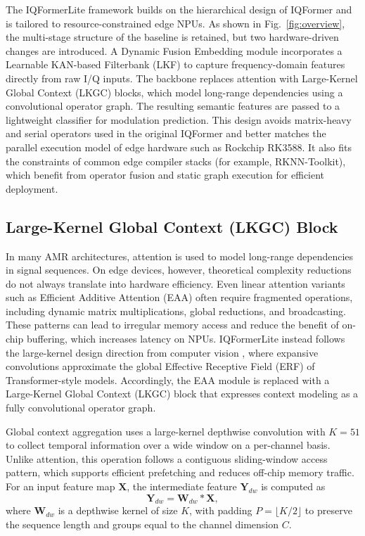 \documentclass{article}
\begin{document}
	The IQFormerLite framework builds on the hierarchical design of IQFormer \cite{shao2025IQFormernovel} and is tailored to resource-constrained edge NPUs.
	As shown in Fig.~\ref{fig:overview}, the multi-stage structure of the baseline is retained, but two hardware-driven changes are introduced.
	A Dynamic Fusion Embedding module incorporates a Learnable KAN-based Filterbank (LKF) to capture frequency-domain features directly from raw I/Q inputs.
	The backbone replaces attention with Large-Kernel Global Context (LKGC) blocks, which model long-range dependencies using a convolutional operator graph.
	The resulting semantic features are passed to a lightweight classifier for modulation prediction.
	This design avoids matrix-heavy and serial operators used in the original IQFormer and better matches the parallel execution model of edge hardware such as Rockchip RK3588.
	It also fits the constraints of common edge compiler stacks (for example, RKNN-Toolkit), which benefit from operator fusion and static graph execution for efficient deployment.
	
	\subsection{Large-Kernel Global Context (LKGC) Block}
	\label{sec:lkgc}
	
	In many AMR architectures, attention is used to model long-range dependencies in signal sequences.
	On edge devices, however, theoretical complexity reductions do not always translate into hardware efficiency.
	Even linear attention variants such as Efficient Additive Attention (EAA) \cite{shaker2023SwiftFormerEfficient} often require fragmented operations, including dynamic matrix multiplications, global reductions, and broadcasting.
	These patterns can lead to irregular memory access and reduce the benefit of on-chip buffering, which increases latency on NPUs.
	IQFormerLite instead follows the large-kernel design direction from computer vision \cite{chen2024PeLKParameterefficient}, where expansive convolutions approximate the global Effective Receptive Field (ERF) of Transformer-style models.
	Accordingly, the EAA module is replaced with a Large-Kernel Global Context (LKGC) block that expresses context modeling as a fully convolutional operator graph.
	
	Global context aggregation uses a large-kernel depthwise convolution with $K{=}51$ to collect temporal information over a wide window on a per-channel basis.
	Unlike attention, this operation follows a contiguous sliding-window access pattern, which supports efficient prefetching and reduces off-chip memory traffic.
	For an input feature map $\mathbf{X}$, the intermediate feature $\mathbf{Y}_{dw}$ is computed as
	\begin{equation}
		\mathbf{Y}_{dw} = \mathbf{W}_{dw} \ast \mathbf{X},
	\end{equation}
	where $\mathbf{W}_{dw}$ is a depthwise kernel of size $K$, with padding $P = \lfloor K/2 \rfloor$ to preserve the sequence length and groups equal to the channel dimension $C$.
	
\end{document}
